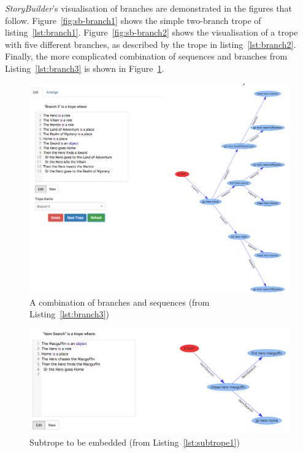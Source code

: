 \documentclass[11pt]{report}
\begin{document}
\emph{StoryBuilder}'s visualisation of branches are demonstrated in the figures
that follow. Figure~\ref{fig:sb-branch1} shows the simple two-branch trope of
listing~\ref{lst:branch1}. Figure~\ref{fig:sb-branch2} shows the visualisation
of a trope with five different branches, as described by the trope in
listing~\ref{lst:branch2}. Finally, the more complicated combination of
sequences and branches from Listing~\ref{lst:branch3} is shown in Figure~\ref{fig:sb-branch3}.

\begin{figure}[!t]
\centerline{\includegraphics[width=\textwidth]{storybuilder-branch3.png}}
\caption{A combination of branches and sequences (from Listing~\ref{lst:branch3})}\label{fig:sb-branch3}
\end{figure}


\begin{figure}[!t]
\centerline{\includegraphics[width=\textwidth]{storybuilder-subtrope1.png}}
\caption{Subtrope to be embedded (from Listing~\ref{lst:subtrope1})}\label{fig:sb-subtrope1}
\end{figure}
\end{document}
